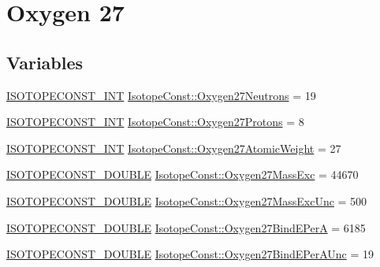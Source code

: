 \hypertarget{group___isotope_const-_oxygen-_o27}{}\section{Oxygen 27}
\label{group___isotope_const-_oxygen-_o27}
\subsection*{Variables}
\begin{DoxyCompactItemize}
\item 
\mbox{\hyperlink{group___isotope_const-_macros_ga5f18360b3e99483a35c32d789e62621c}{I\+S\+O\+T\+O\+P\+E\+C\+O\+N\+S\+T\+\_\+\+I\+NT}} \mbox{\hyperlink{group___isotope_const-_oxygen-_o27_gac8a7730809b4586dfd880bfcd8cd019f}{Isotope\+Const\+::\+Oxygen27\+Neutrons}} = 19
\item 
\mbox{\hyperlink{group___isotope_const-_macros_ga5f18360b3e99483a35c32d789e62621c}{I\+S\+O\+T\+O\+P\+E\+C\+O\+N\+S\+T\+\_\+\+I\+NT}} \mbox{\hyperlink{group___isotope_const-_oxygen-_o27_gaf38ef6fd807de4f1c811acf97d4a37cb}{Isotope\+Const\+::\+Oxygen27\+Protons}} = 8
\item 
\mbox{\hyperlink{group___isotope_const-_macros_ga5f18360b3e99483a35c32d789e62621c}{I\+S\+O\+T\+O\+P\+E\+C\+O\+N\+S\+T\+\_\+\+I\+NT}} \mbox{\hyperlink{group___isotope_const-_oxygen-_o27_gac96022036f2f74f9f63a65359d50be26}{Isotope\+Const\+::\+Oxygen27\+Atomic\+Weight}} = 27
\item 
\mbox{\hyperlink{group___isotope_const-_macros_ga8f45a7272ce02c0b4c65c44636ed719a}{I\+S\+O\+T\+O\+P\+E\+C\+O\+N\+S\+T\+\_\+\+D\+O\+U\+B\+LE}} \mbox{\hyperlink{group___isotope_const-_oxygen-_o27_ga4ba1f8867811a62b66301f7d336fa278}{Isotope\+Const\+::\+Oxygen27\+Mass\+Exc}} = 44670
\item 
\mbox{\hyperlink{group___isotope_const-_macros_ga8f45a7272ce02c0b4c65c44636ed719a}{I\+S\+O\+T\+O\+P\+E\+C\+O\+N\+S\+T\+\_\+\+D\+O\+U\+B\+LE}} \mbox{\hyperlink{group___isotope_const-_oxygen-_o27_ga07c2c24e5a57a729ad6d24c1f1328b3d}{Isotope\+Const\+::\+Oxygen27\+Mass\+Exc\+Unc}} = 500
\item 
\mbox{\hyperlink{group___isotope_const-_macros_ga8f45a7272ce02c0b4c65c44636ed719a}{I\+S\+O\+T\+O\+P\+E\+C\+O\+N\+S\+T\+\_\+\+D\+O\+U\+B\+LE}} \mbox{\hyperlink{group___isotope_const-_oxygen-_o27_gab5d7d4cdb4cf06c36d87e9b1fcaafa21}{Isotope\+Const\+::\+Oxygen27\+Bind\+E\+PerA}} = 6185
\item 
\mbox{\hyperlink{group___isotope_const-_macros_ga8f45a7272ce02c0b4c65c44636ed719a}{I\+S\+O\+T\+O\+P\+E\+C\+O\+N\+S\+T\+\_\+\+D\+O\+U\+B\+LE}} \mbox{\hyperlink{group___isotope_const-_oxygen-_o27_ga1d159abac5e72cf6e7ea0d1d4c3ae612}{Isotope\+Const\+::\+Oxygen27\+Bind\+E\+Per\+A\+Unc}} = 19

\end{DoxyCompactItemize}
